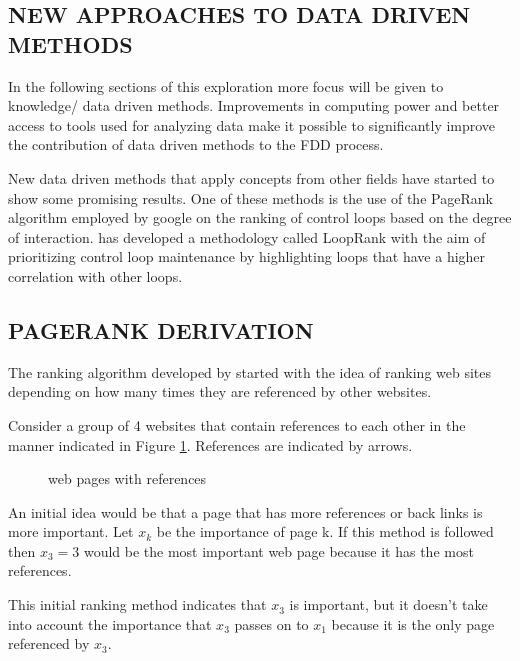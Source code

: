 \subsection{NEW APPROACHES TO DATA DRIVEN METHODS}

In the following sections of this exploration more focus will be given to knowledge/ data driven methods. Improvements in computing power and better access to tools used for analyzing data make it possible to significantly improve the contribution of data driven methods to the FDD process.

New data driven methods that apply concepts from other fields have started to show some promising results. One of these methods is the use of the PageRank algorithm \cite{bryan200625} employed by google on the ranking of control loops based on the degree of interaction.\cite{farenzena2009looprank} has developed a methodology called LoopRank with the aim of prioritizing control loop maintenance by highlighting loops that have a higher correlation with other loops.\\

\subsection{PAGERANK DERIVATION}

The ranking algorithm developed by \cite{bryan200625} started with the idea of ranking web sites depending on how many times they are referenced by other websites.

Consider a group of 4 websites that contain references to each other in the manner indicated in Figure \ref{fig:7}. References are indicated by arrows.\\
\begin{figure}[H]
	\centering{}
	\caption{web pages with references}\label{fig:7}
\end{figure}
An initial idea would be that a page that has more references or back links is more important. Let $x_{k}$ be the importance of page k. If this method is followed then $x_{3} = 3$ would be the most important web page because it has the most references.

This initial ranking method indicates that $x_{3}$ is important, but it doesn't take into account the importance that $x_{3}$ passes on to $x_{1}$ because it is the only page referenced by $x_{3}$.

